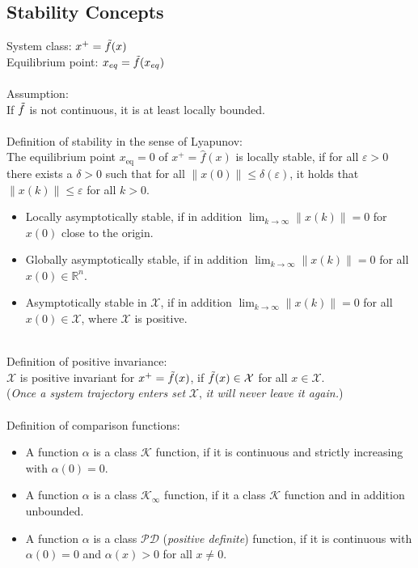 \documentclass[english]{latex4ei/latex4ei_sheet}
\begin{document}
\begin{sectionbox}
\subsection{Stability Concepts}
System class: $x^{+}=\Tilde{f}(x)$\\
Equilibrium point: $x_{eq}=\Tilde{f}(x_{eq})$\\
\\
Assumption:\\
If $\Tilde{f}$ is not continuous, it is at least locally bounded.\\
\\
Definition of stability in the sense of Lyapunov:\\
The equilibrium point $x_{\mathrm{eq}}=0$ of $x^{+}=\hat{f}(x)$ is locally stable, if for all $\varepsilon>0$ there exists a $\delta>0$ such that for all $\|x(0)\| \leq \delta(\varepsilon)$, it holds that $\|x(k)\| \leq \varepsilon$ for all $k>0$.
\begin{itemize}
    \item Locally asymptotically stable, if in addition $\lim _{k \rightarrow \infty}\|x(k)\|=0$ for $x(0)$ close to the origin.
    \item Globally asymptotically stable, if in addition $\lim _{k \rightarrow \infty}\|x(k)\|=0$ for all $x(0) \in \mathbb{R}^{n}$.
    \item Asymptotically stable in $\mathcal{X}$, if in addition $\lim _{k \rightarrow \infty}\|x(k)\|=0$ for all $x(0) \in \mathcal{X}$, where $\mathcal{X}$ is positive.
\end{itemize}
\vspace{0.1cm}\\ 
Definition of positive invariance:\\
$\mathcal{X}$ is positive invariant for $x^{+}=\Tilde{f}(x)$, if $\Tilde{f}(x)\in\mathcal{X}$ for all $x\in\mathcal{X}$.\\
(\textit{Once a system trajectory enters set} $\mathcal{X}$, \textit{it will never leave it again.})\\
\\
Definition of comparison functions:
\begin{itemize}
    \item A function $\alpha$ is a class $\mathcal{K}$ function, if it is continuous and strictly increasing with $\alpha(0)=0$.
    \item A function $\alpha$ is a class $\mathcal{K}_{\infty}$ function, if it a class $\mathcal{K}$ function and in addition unbounded.
    \item A function $\alpha$ is a class $\mathcal{PD}$ (\textit{positive definite}) function, if it is continuous with $\alpha(0)=0$ and $\alpha(x)>0$ for all $x\neq0$.

\end{itemize}
\end{sectionbox}
\end{document}

